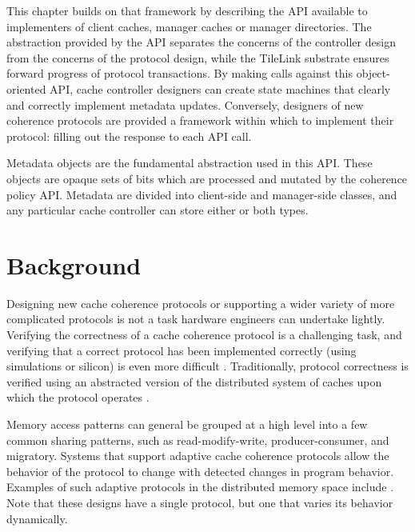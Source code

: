 This chapter builds on that framework by describing the API available to implementers of client caches, 
manager caches or manager directories. 
The abstraction provided by the API separates the concerns of the controller design
from the concerns of the protocol design, 
while the TileLink substrate ensures forward progress of protocol transactions. 
By making calls against this object-oriented API, cache controller designers can
create state machines that clearly and correctly implement metadata updates. 
Conversely, designers of new coherence protocols are provided a framework
within which to implement their protocol: filling out the response to each API call.

Metadata objects are the fundamental abstraction used in this API.
These objects are opaque sets of bits which are processed and mutated by the coherence policy API.
Metadata are divided into client-side and manager-side classes,
and any particular cache controller can store either or both types.

\section{Background} 

Designing new cache coherence protocols or supporting a wider variety of more complicated protocols is not a task hardware engineers can undertake lightly.
Verifying the correctness of a cache coherence protocol is a challenging task, and
verifying that a correct protocol has been implemented correctly (using simulations or silicon) is even more difficult
\cite{deorio2008post, bentley2001validating, burckhardt2005verifying, clarke1995verification, dill1992protocol, wood1990verifying}.
Traditionally, protocol correctness is verified using an abstracted version of the distributed system of caches upon which the protocol operates
\cite{talupur2008going, delzanno2003constraint, pong1997verification, wood1990verifying, mcmillan2001parameterized}.

Memory access patterns can general be grouped at a high level into a few common sharing patterns, such as read-modify-write, producer-consumer, and migratory. Systems that support adaptive cache coherence protocols allow the behavior of the protocol to change with detected changes in program behavior.  Examples of such adaptive protocols in the distributed memory space include \cite{amza-hpca97,lebeck-archnews95,stenstrom-isca93,cox-isca93}. Note that these designs have a single protocol, but one that varies its behavior dynamically.

